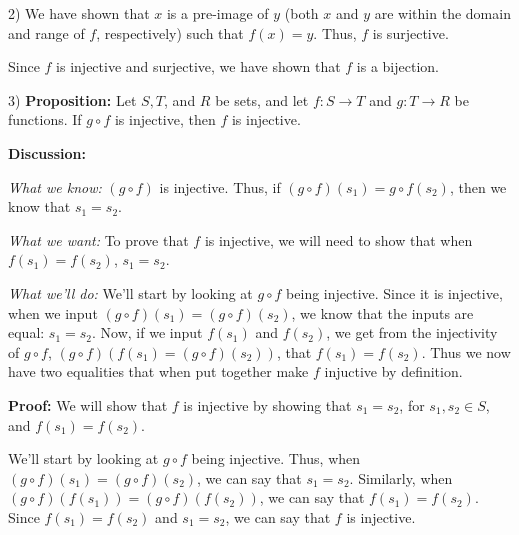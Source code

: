 \begin{paragraph}{2)}
    We have shown that $x$ is a pre-image of $y$ (both $x$ and $y$ are within
    the domain and range of $f$, respectively) such that $f(x) = y$.
    Thus, $f$ is surjective.
    \spacing

    Since $f$ is injective and surjective, we have shown that $f$ is a bijection.
    \proofEnd
    \end{paragraph}

    \bigskip

    \begin{paragraph}{3)}
    \textbf{Proposition:} Let $S, T$, and $R$ be sets, and let $f: S \to T$ and $g: T \to R$ be functions.  If $g \circ f$ is injective, then $f$ is injective.  
    \spacing

    \textbf{Discussion:}
    
    \textit{What we know:} $(g \circ f)$ is injective. Thus, if $(g \circ f)(s_1) = g \circ f(s_2)$, then we know that $s_1 = s_2$. 
    \spacing

    \textit{What we want:} To prove that $f$ is injective, we will need to show that when $f(s_1) = f(s_2)$, $s_1 = s_2$.
    \spacing

    \textit{What we'll do:} We'll start by looking at $g \circ f$ being injective.
    Since it is injective, when we input $(g \circ f)(s_1) = (g \circ f)(s_2)$, we 
    know that the inputs are equal: $s_1 = s_2$. Now, if we input $f(s_1)$ and $f(s_2)$,
    we get from the injectivity of $g \circ f$, $(g \circ f)(f(s_1) = (g \circ f)(s_2))$,
    that $f(s_1) = f(s_2)$. Thus we now have two equalities that when put together
    make $f$ injuctive by definition.  
    \spacing

    \textbf{Proof:} We will show that $f$ is injective by showing that $s_1 = s_2$, 
    for $s_1, s_2 \in S$, and $f(s_1) = f(s_2)$.
    \spacing
    
    We'll start by looking at $g \circ f$ being injective. Thus, when 
    $(g \circ f)(s_1) = (g \circ f)(s_2)$, we can say that $s_1 = s_2$.
    Similarly, when $(g \circ f)(f(s_1)) = (g \circ f)(f(s_2))$, we can say that
    $f(s_1) = f(s_2)$. Since $f(s_1) = f(s_2)$ and $s_1 = s_2$, we can say that 
    $f$ is injective. 

    \proofEnd
    \end{paragraph}

    \bigskip

